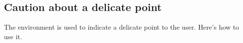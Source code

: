 \documentclass[10pt, a4paper]{article}
\begin{document}

\subsection{Caution about a delicate point}

The  environment is used to indicate a delicate point to the user. Here's how to use it.

\end{document}
